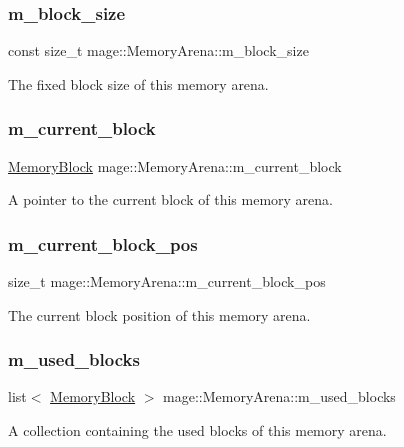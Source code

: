 \subsubsection{\texorpdfstring{m\+\_\+block\+\_\+size}{m\_block\_size}}
{\footnotesize\ttfamily const size\+\_\+t mage\+::\+Memory\+Arena\+::m\+\_\+block\+\_\+size\hspace{0.3cm}{\ttfamily [private]}}

The fixed block size of this memory arena. \hypertarget{classmage_1_1_memory_arena_a2680b25146c174ac7fd639f1bd0acc7c}{}\label{classmage_1_1_memory_arena_a2680b25146c174ac7fd639f1bd0acc7c} 
\subsubsection{\texorpdfstring{m\+\_\+current\+\_\+block}{m\_current\_block}}
{\footnotesize\ttfamily \hyperlink{classmage_1_1_memory_arena_a6026a114bb2ecc405dd5ebf54e4c12d5}{Memory\+Block} mage\+::\+Memory\+Arena\+::m\+\_\+current\+\_\+block\hspace{0.3cm}{\ttfamily [private]}}

A pointer to the current block of this memory arena. \hypertarget{classmage_1_1_memory_arena_a880d07eb372ce1c8b907947fcbdfc59c}{}\label{classmage_1_1_memory_arena_a880d07eb372ce1c8b907947fcbdfc59c} 
\subsubsection{\texorpdfstring{m\+\_\+current\+\_\+block\+\_\+pos}{m\_current\_block\_pos}}
{\footnotesize\ttfamily size\+\_\+t mage\+::\+Memory\+Arena\+::m\+\_\+current\+\_\+block\+\_\+pos\hspace{0.3cm}{\ttfamily [private]}}

The current block position of this memory arena. \hypertarget{classmage_1_1_memory_arena_a37891872cff5b86bb1f9c40b4450b904}{}\label{classmage_1_1_memory_arena_a37891872cff5b86bb1f9c40b4450b904} 
\subsubsection{\texorpdfstring{m\+\_\+used\+\_\+blocks}{m\_used\_blocks}}
{\footnotesize\ttfamily list$<$ \hyperlink{classmage_1_1_memory_arena_a6026a114bb2ecc405dd5ebf54e4c12d5}{Memory\+Block} $>$ mage\+::\+Memory\+Arena\+::m\+\_\+used\+\_\+blocks\hspace{0.3cm}{\ttfamily [private]}}

A collection containing the used blocks of this memory arena. 